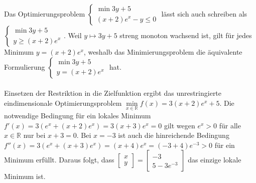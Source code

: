 
Das Optimierungsproblem $\begin{cases}\min 3y+5\\(x+2)e^x-y\leq 0\end{cases}$ lässt sich auch schreiben als $\begin{cases}\min 3y+5\\y\geq (x+2)e^x\end{cases}$. Weil $y\mapsto 3y+5$ streng monoton wachsend ist, gilt für jedes Minimum $y= (x+2)e^x$, weshalb das Minimierungsproblem die äquivalente Formulierung $\begin{cases}\min 3y+5\\y=(x+2)e^x\end{cases}$ hat.\\\\
Einsetzen der Restriktion in die Zielfunktion ergibt das unrestringierte eindimensionale Optimierungsproblem $\min\limits_{x\in\mathbb R} f(x)=3(x+2)e^x+5$. Die notwendige Bedingung für ein lokales Minimum $f'(x)=3(e^x+(x+2)e^x)=3(x+3)e^x=0$ gilt wegen $e^x>0$ für alle $x\in\mathbb R$ nur bei $x+3=0$. Bei $x=-3$ ist auch die hinreichende Bedingung $f''(x)=3(e^x+(x+3)e^x)=(x+4)e^x=(-3+4)e^{-3}>0$ für ein Minimum erfüllt. Daraus folgt, dass $\begin{bmatrix}x\\y\end{bmatrix}=\begin{bmatrix}-3\\5-3e^{-3}\end{bmatrix}$ das einzige lokale Minimum ist.